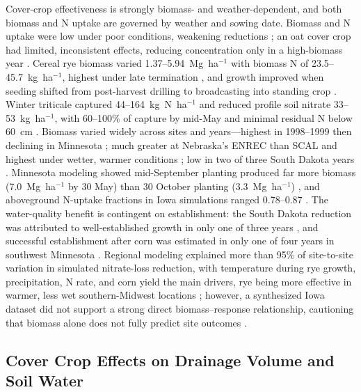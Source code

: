 Cover-crop effectiveness is strongly biomass- and weather-dependent, and both biomass and N uptake are governed by weather and sowing date. Biomass and N uptake were low under poor conditions, weakening reductions \parencite{PrezaFontes2021}; an oat cover crop had limited, inconsistent effects, reducing concentration only in a high-biomass year \parencite{OBrien2022}. Cereal rye biomass varied 1.37--5.94~Mg~ha$^{-1}$ with biomass N of 23.5--45.7~kg~ha$^{-1}$, highest under late termination \parencite{Gentry2025}, and growth improved when seeding shifted from post-harvest drilling to broadcasting into standing crop \parencite{Waring2024}. Winter triticale captured 44--164~kg~N~ha$^{-1}$ and reduced profile soil nitrate 33--53~kg~ha$^{-1}$, with 60--100\% of capture by mid-May and minimal residual N below 60~cm \parencite{Nance2007}. Biomass varied widely across sites and years---highest in 1998--1999 then declining in Minnesota \parencite{Strock2004}; much greater at Nebraska's ENREC than SCAL and highest under wetter, warmer conditions \parencite{Birru2023}; low in two of three South Dakota years \parencite{Bawa2023}. Minnesota modeling showed mid-September planting produced far more biomass (7.0~Mg~ha$^{-1}$ by 30 May) than 30 October planting (3.3~Mg~ha$^{-1}$) \parencite{Feyereisen2006b}, and aboveground N-uptake fractions in Iowa simulations ranged 0.78--0.87 \parencite{Malone2018}. The water-quality benefit is contingent on establishment: the South Dakota reduction was attributed to well-established growth in only one of three years \parencite{Bawa2023}, and successful establishment after corn was estimated in only one of four years in southwest Minnesota \parencite{Strock2004}. Regional modeling explained more than 95\% of site-to-site variation in simulated nitrate-loss reduction, with temperature during rye growth, precipitation, N rate, and corn yield the main drivers, rye being more effective in warmer, less wet southern-Midwest locations \parencite{Malone2014b}; however, a synthesized Iowa dataset did not support a strong direct biomass--response relationship, cautioning that biomass alone does not fully predict site outcomes \parencite{MartinezFeria2016}.

\subsection{Cover Crop Effects on Drainage Volume and Soil Water}

